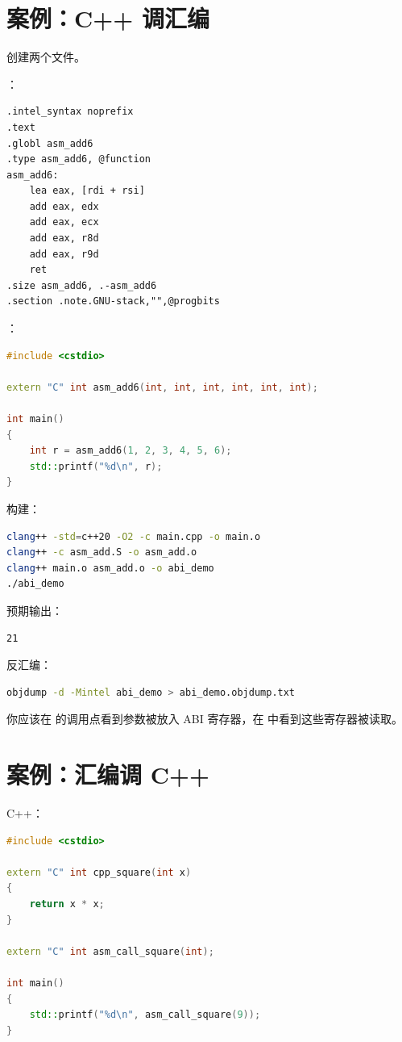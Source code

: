 \section{案例：C++ 调汇编}

创建两个文件。

：

\begin{lstlisting}
.intel_syntax noprefix
.text
.globl asm_add6
.type asm_add6, @function
asm_add6:
    lea eax, [rdi + rsi]
    add eax, edx
    add eax, ecx
    add eax, r8d
    add eax, r9d
    ret
.size asm_add6, .-asm_add6
.section .note.GNU-stack,"",@progbits
\end{lstlisting}

：

\begin{lstlisting}[language=C++]
#include <cstdio>

extern "C" int asm_add6(int, int, int, int, int, int);

int main()
{
    int r = asm_add6(1, 2, 3, 4, 5, 6);
    std::printf("%d\n", r);
}
\end{lstlisting}

构建：

\begin{lstlisting}[language=bash]
clang++ -std=c++20 -O2 -c main.cpp -o main.o
clang++ -c asm_add.S -o asm_add.o
clang++ main.o asm_add.o -o abi_demo
./abi_demo
\end{lstlisting}

预期输出：

\begin{lstlisting}
21
\end{lstlisting}

反汇编：

\begin{lstlisting}[language=bash]
objdump -d -Mintel abi_demo > abi_demo.objdump.txt
\end{lstlisting}

你应该在  的调用点看到参数被放入 ABI 寄存器，在  中看到这些寄存器被读取。

\section{案例：汇编调 C++}

C++：

\begin{lstlisting}[language=C++]
#include <cstdio>

extern "C" int cpp_square(int x)
{
    return x * x;
}

extern "C" int asm_call_square(int);

int main()
{
    std::printf("%d\n", asm_call_square(9));
}
\end{lstlisting}

